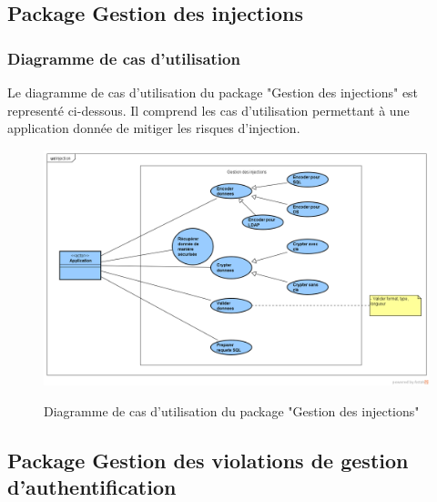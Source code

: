 \subsection{Package Gestion des injections}

\subsubsection{Diagramme de cas d'utilisation}
Le diagramme de cas d'utilisation du package "Gestion des injections" est representé ci-dessous. Il comprend les cas d'utilisation permettant à une application donnée de mitiger les risques d'injection.\\ 
\begin{figure}[H]
	\centering
	\begin{minipage}{12cm}
		\centering
		{\includegraphics[height=0.30\textheight]{fig/Injection-use-case-diagram.png}}
	\end{minipage}
	\caption{Diagramme de cas d'utilisation du package "Gestion des injections"}
	\label{fig:7.2}
\end{figure}

\subsection{Package Gestion des violations de gestion d'authentification}

